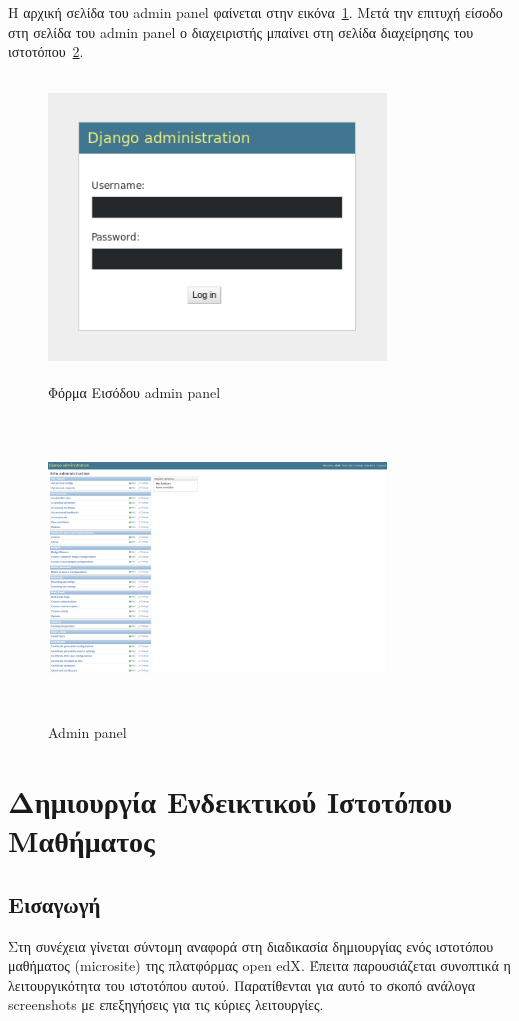 \documentclass[12pt]{report}
\begin{document}
Η αρχική σελίδα του \textlatin{admin panel} φαίνεται στην εικόνα~\ref{fig:django-login}. Μετά την επιτυχή είσοδο στη σελίδα του \textlatin{admin panel} ο διαχειριστής μπαίνει στη σελίδα διαχείρησης του ιστοτόπου~\ref{fig:django-landing}.
\begin{figure}[h]
\centering
\includegraphics[width=0.8\textwidth, height=8cm]{django-login}
\caption{Φόρμα Εισόδου \textlatin{admin panel}}
\label{fig:django-login}
\end{figure}

\begin{figure}[h]
\centering
\includegraphics[width=0.8\textwidth, height=8cm]{django-landing-page}
\caption{\textlatin{Admin panel}}
\label{fig:django-landing}
\end{figure}

\chapter{Δημιουργία Ενδεικτικού Ιστοτόπου Μαθήματος}\label{ch4}
\section{Εισαγωγή}
Στη συνέχεια γίνεται σύντομη αναφορά στη διαδικασία δημιουργίας ενός ιστοτόπου μαθήματος (\textlatin{microsite}) της πλατφόρμας \textlatin{open edX}. Έπειτα παρουσιάζεται συνοπτικά η λειτουργικότητα του ιστοτόπου αυτού. Παρατίθενται για αυτό το σκοπό ανάλογα \textlatin{screenshots} με επεξηγήσεις για τις κύριες λειτουργίες.
\end{document}
